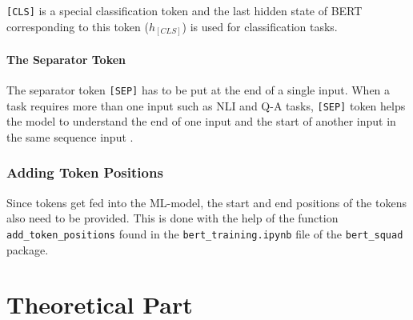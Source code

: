                     \texttt{[CLS]} is a special classification token and the last hidden state of BERT corresponding to this token ($h_{[CLS]}$) is used for classification tasks. \cite[Section - Model Overview]{allYouNeedBERT}


                \paragraph{The Separator Token}
                \label{par:-the-separator-token}

                    The separator token \texttt{[SEP]} has to be put at the end of a single input.
                    When a task requires more than one input such as NLI and Q-A tasks, \texttt{[SEP]} token helps the model to understand the end of one input and the start of another input in the same sequence input \cite[Section - Model Overview]{allYouNeedBERT}.


            \subsubsection{Adding Token Positions}
            \label{par:-data-preprocessing-augmenting---adding-token-positions}

                Since tokens get fed into the ML-model, the start and end positions of the tokens also need to be provided.
                This is done with the help of the function \texttt{add\_token\_positions} found in the \texttt{bert\_training.ipynb} file of the \texttt{bert\_squad} package.

\pagebreak
    \section{Theoretical Part}
    \label{sec:theoretical-part}
            


